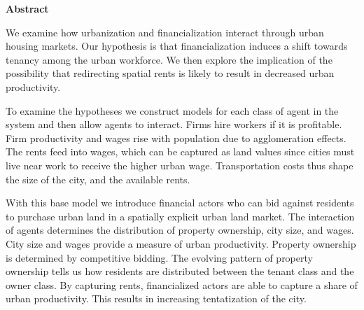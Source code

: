 \begin{center}\textbf{Abstract}\end{center}

We examine how urbanization and financialization interact through urban housing markets. %
Our hypothesis is that financialization induces a shift towards tenancy among the urban workforce.  We then explore the implication of the possibility 
that redirecting spatial rents is likely to result in decreased urban productivity. 

To examine the hypotheses we construct models for each class of agent in the system and then allow agents to interact. Firms hire workers if it is profitable. Firm productivity and wages rise with population due to agglomeration effects. The rents feed into wages, which can be captured as land values since cities must live near work to receive the higher urban wage. Transportation costs thus shape the size of the city, and the available rents. %

With this base model we introduce financial actors who can bid against residents to purchase urban land in a spatially explicit urban land market. %
The interaction of agents determines the distribution of property ownership,  city size, and wages. City size and wages provide a measure of urban productivity. Property ownership is determined by competitive bidding. The evolving pattern of property ownership tells us how residents are distributed between the tenant class and the owner class. %
By capturing rents, financialized actors are able to capture a share of urban productivity. This results in increasing tentatization of the city.

